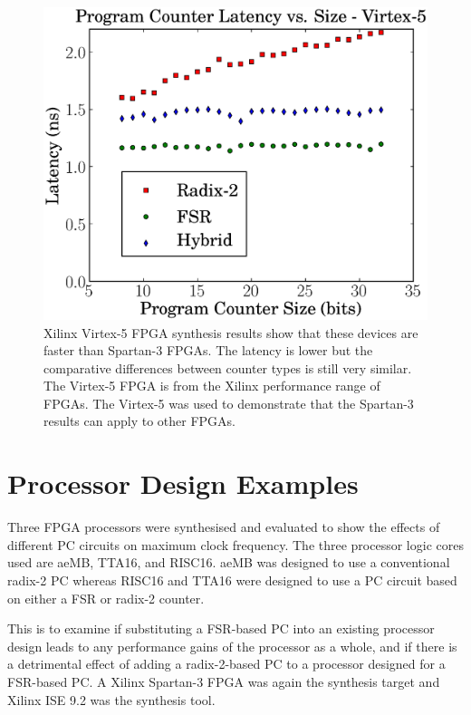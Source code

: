 \documentclass[5p, twocolumn]{elsarticle}
\begin{document}
\begin{figure}[ht!]
\begin{center}
\includegraphics[width=\linewidth]{graphs/hybrid_pc_virtex.eps}
\caption[Hybrid PC performance vs. counter size]{Xilinx Virtex-5 FPGA
synthesis results show that these devices are faster than Spartan-3 FPGAs.
The latency is lower but the comparative differences between counter types is
still very similar. The Virtex-5 FPGA is from the Xilinx performance range of
FPGAs. The Virtex-5 was used to demonstrate that the Spartan-3 results can
apply to other FPGAs.}
\label{GRAPH_PC_VIRTEX}
\end{center}
\end{figure}



%

\section{Processor Design Examples}

Three FPGA processors were synthesised and evaluated to show the effects of
different PC circuits on maximum clock frequency. The three processor logic cores
used are aeMB, TTA16, and RISC16. aeMB was designed to use a conventional radix-2
PC whereas RISC16 and TTA16 were designed to use a PC circuit based on either a
FSR or radix-2 counter.

This is to examine if substituting a FSR-based PC into an existing processor
design leads to any performance gains of the processor as a whole, and if there
is a detrimental effect of adding a radix-2-based PC to a processor designed for
a FSR-based PC. A Xilinx Spartan-3 FPGA was again the synthesis target and Xilinx
ISE 9.2 was the synthesis tool.
\end{document}
